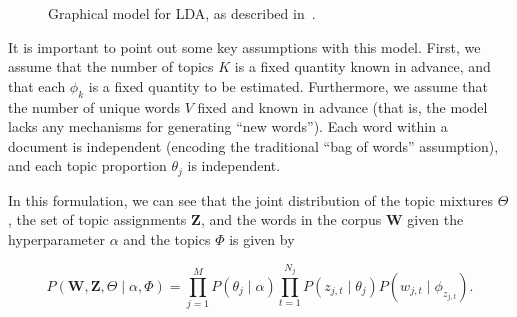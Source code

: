\documentclass[11pt]{article}
\begin{document}
\begin{figure}[H]
  \begin{center}
  \end{center}
  \caption{Graphical model for LDA, as described in~\cite{Blei:2003:LDA}.}
  \label{fig:ldamodel}
\end{figure}

It is important to point out some key assumptions with this model. First,
we assume that the number of topics $K$ is a fixed quantity known in
advance, and that each $\phi_k$ is a fixed quantity to be estimated.
Furthermore, we assume that the number of unique words $V$ fixed and known
in advance (that is, the model lacks any mechanisms for generating ``new
words'').  Each word within a document is independent (encoding the
traditional ``bag of words'' assumption), and each topic proportion
$\theta_j$ is independent.

In this formulation, we can see that the joint distribution of the topic
mixtures $\Theta$, the set of topic assignments $\mathbf{Z}$, and the words
in the corpus $\mathbf{W}$ given the hyperparameter $\alpha$ and the topics
$\Phi$ is given by

\begin{equation}
  P(\mathbf{W}, \mathbf{Z}, \Theta \mid \alpha, \Phi)
  = \prod_{j=1}^M P(\theta_j \mid \alpha)
  \prod_{t=1}^{N_j} P(z_{j,t} \mid \theta_j) P(w_{j,t} \mid
  \phi_{z_{j,t}}).
  \label{eqn:fulljoint}
\end{equation}
\end{document}
